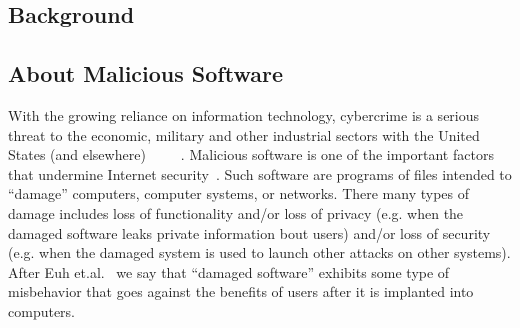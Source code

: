 \documentclass{NSF}
\begin{document}
\begin{nsfdescription}
\section{Background}

\subsection{About Malicious Software}
With the growing reliance on information technology, cybercrime is a serious threat to the economic, military and other industrial sectors with the United States
(and elsewhere)~\cite{bissell2019cost}~\cite{jang2014survey}~\cite{chang2019evaluating}~\cite{opderbeck2015cybersecurity}~\cite{rovskot2020cybercrime}.  
Malicious software is one of the important factors that undermine Internet security~\cite{dai19}. 
Such software are programs of files intended to ``damage'' computers, computer systems, or networks. There many types of damage includes loss of functionality and/or loss of privacy
(e.g. when the damaged software leaks private information bout users) and/or loss of security (e.g. when the damaged system is used to launch other attacks on other systems). After Euh et.al.~\cite{euh2020comparative} we say that ``damaged software'' exhibits some type of misbehavior that goes against the benefits of users after it is implanted into computers. 
 

\end{nsfdescription}
\end{document}
